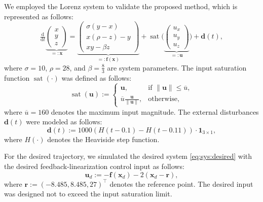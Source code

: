 \documentclass{ifacconf}
\newcommand*{\mv}[1]{\boldsymbol{#1}} %
\newcommand*{\norm}[1]{\lVert #1 \rVert} %
\DeclareMathOperator{\mysat}{{sat}}       %
\newcommand\der{\mathrm d}
\newcommand*{\ddtt}{
   \tfrac{\der}{\der t}
}
\begin{document}
We employed the Lorenz system to validate the proposed method, which is represented as follows:
\begin{equation}
   \ddtt
   \underbrace{
      \begin{pmatrix}
         x\\y\\z
      \end{pmatrix}
   }_{=:\mv{x}}
   =
   \underbrace{
      \begin{pmatrix}
         \sigma(y-x)
         \\
         x(\rho-z)-y
         \\
         xy-\beta z
      \end{pmatrix}
   }_{=:\mv{f}(\mv{x})}
   +
   \mysat
   \bigg(
      \underbrace{
         \begin{pmatrix}
            u_x\\u_y\\u_z
         \end{pmatrix}
      }_{=:\mv{u}}
   \bigg)
   +
   \mv{d}(t)
   ,
\end{equation}
where $\sigma=10$, $\rho=28$, and $\beta=\tfrac{8}{3}$ are system parameters.
The input saturation function $\mysat(\cdot)$ was defined as follows:
\begin{equation}
   \mysat(\mv{u})
   :=
   \begin{cases}
      \mv{u}
      ,
      & \text{if } \norm{\mv{u}} \le \overline{u}
      ,
      \\
      \overline{u} \tfrac{\mv{u}}{\norm{\mv{u}}}
      ,
      & \text{otherwise}
      ,
   \end{cases}
\end{equation}
where $\overline{u}=160$ denotes the maximum input magnitude.
The external disturbances $\mv{d}(t)$ were modeled as follows:
\begin{equation}
   \mv{d}(t)
   :=
   1000 (H(t-0.1)-H(t-0.11))
   \cdot
   \mv{1}_{3\times1}
   ,
\end{equation}
where $H(\cdot)$ denotes the Heaviside step function.

For the desired trajectory, we simulated the desired system \eqref{eq:sys:desired} with the desired feedback-linearization control input as follows:
\begin{equation}
   \mv{u}_d
   :=
   -\mv{f}(\mv{x}_d) - 2(\mv{x}_d - \mv{r})
   ,
\end{equation}
where $\mv{r}:=(-8.485,8.485,27)^\top$ denotes the reference point.
The desired input was designed not to exceed the input saturation limit.
\end{document}
